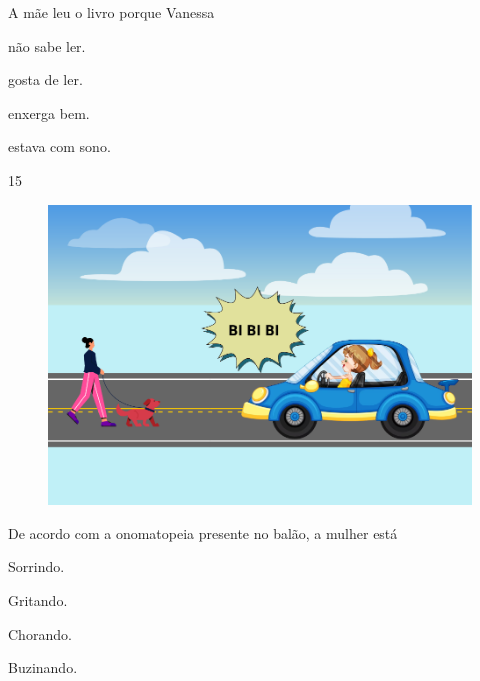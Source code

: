 A mãe leu o livro porque Vanessa

\begin{escolha}
\item não sabe ler.

\item gosta de ler.

\item enxerga bem.

\item estava com sono.
\end{escolha}


\num{15}

\begin{figure}[htpb!]
\centering
\includegraphics[width=.5\textwidth]{media/image182.png}
\end{figure}


De acordo com a onomatopeia presente no balão, a mulher está

\begin{escolha}
\item Sorrindo.

\item Gritando.

\item Chorando.

\item Buzinando.
\end{escolha}




